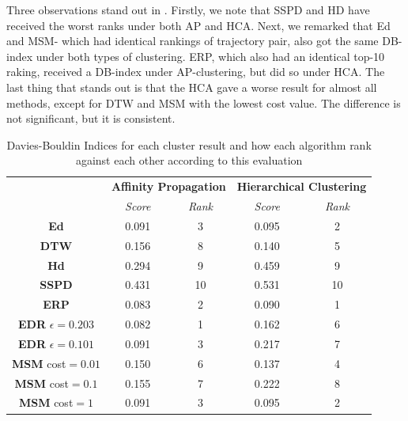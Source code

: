 Three observations stand out in .
Firstly, we note that SSPD and HD have received the worst ranks under both AP and HCA. 
Next, we remarked that Ed and MSM- which had identical rankings of trajectory pair, also got the same DB-index under both types of clustering.
ERP,  which also had an identical top-10 raking, received a DB-index under AP-clustering, but did so under HCA. 
The last thing that stands out is that the HCA gave a worse result for almost all methods, except for DTW and MSM with the lowest cost value. The difference is not significant, but it is consistent.


\begin{table}[h!]
\centering
\caption{Davies-Bouldin Indices for each cluster result and how each algorithm rank against each other according to this evaluation  }
\renewcommand{\arraystretch}{1.1}
\begin{tabular}{|c|	c|c|c|c|} 
\cline{2-5}
\multicolumn{1}{c|}{} & \multicolumn{2}{c|}{\textbf{Affinity Propagation}} & \multicolumn{2}{c|}{\textbf{Hierarchical Clustering}}  \\ 
\cline{2-5}
\multicolumn{1}{c|}{} & \textit{Score} & \textit{Rank}  & \textit{Score} & \textit{Rank}     \\ 
\hline
\textbf{Ed}           & 0.091 & 3    & 0.095 & 2        \\ 
\hline
\textbf{DTW}          & 0.156 & 8    & 0.140 & 5        \\ 
\hline
\textbf{Hd}           & 0.294 & 9    & 0.459 & 9        \\ 
\hline
\textbf{SSPD}         & 0.431 & 10   & 0.531 & 10       \\ 
\hline
\textbf{ERP}    & 0.083 & 2    & 0.090 & 1        \\ 
\hline
\textbf{EDR} $\epsilon=0.203$  & 0.082 & 1    & 0.162 & 6        \\ 
\hline
\textbf{EDR} $\epsilon=0.101$  & 0.091 & 3    & 0.217 & 7        \\ 
\hline
\textbf{MSM} cost$=0.01$   & 0.150 & 6    & 0.137 & 4        \\ 
\hline
\textbf{MSM} cost$=0.1$    & 0.155 & 7    & 0.222 & 8        \\ 
\hline
\textbf{MSM} cost$=1$      & 0.091 & 3    & 0.095 & 2        \\
\hline
\end{tabular}
\label{tab:cluster-dbidx}
\end{table}



